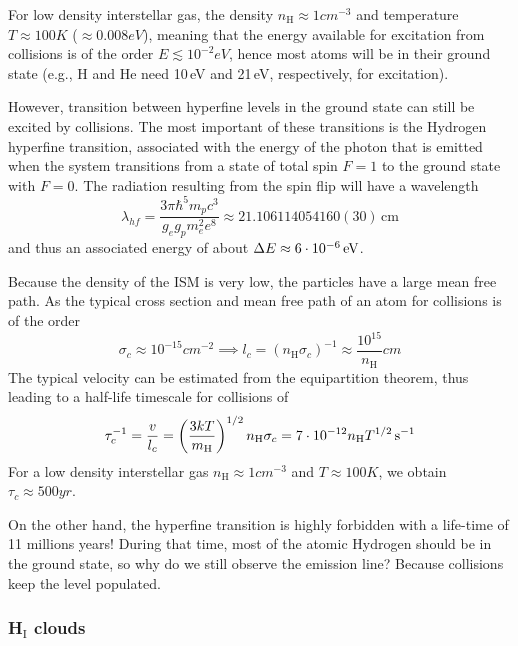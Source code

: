 For low density interstellar gas, the density $n_{\text{H}}\approx 1\unit{cm}^{-3}$ and temperature $T\approx 100\unit{K}$ ($\approx 0.008\unit{eV}$), meaning that the energy available for excitation from collisions is of the order $E\lesssim 10^{-2}\unit{eV}$, hence most atoms will be in their ground state (e.g., H and He need 10\,eV and 21\,eV, respectively, for excitation).
\par However, transition between hyperfine levels in the ground state can still be excited by collisions. The most important of these transitions is the Hydrogen hyperfine transition, associated with the energy of the photon that is emitted when the system transitions from a state of total spin $F=1$ to the ground state with $F=0$. The radiation resulting from the spin flip will have a wavelength 
\begin{equation}
    \lambda_{hf} = \frac{3\pi\hbar^{5}m_{p}c^{3}}{g_{e}g_{p}m_{e}^{2}e^{8}}\approx 21.106114054160(30)\,\text{cm}
    \label{eq:21cm}
\end{equation}
and thus an associated energy of about $\Delta E \approx 6\cdot 10^{-6}\,\text{eV}$.
\par Because the density of the ISM is very low, the particles have a large mean free path. As the typical cross section and mean free path of an atom for collisions is of the order
\begin{equation*}
    \sigma_{c} \approx 10^{-15}\unit{cm}^{-2} \implies l_{c} = (n_{\text{H}}\sigma_{c})^{-1}\approx \frac{10^{15}}{n_{\text{H}}}\unit{cm}
\end{equation*}
The typical velocity can be estimated from the equipartition theorem, thus leading to a half-life timescale for collisions of 
\begin{equation}
    \tau_{c}^{-1} = \frac{v}{l_{c}} = \left(\frac{3kT}{m_{\text{H}}}\right)^{1/2}n_{\text{H}}\sigma_{c} = 7\cdot 10^{-12}n_{\text{H}}T^{1/2}\,\text{s}^{-1}
    \label{eq:collisiontimescale}
\end{equation}
For a low density interstellar gas $n_{\text{H}}\approx 1\unit{cm}^{-3}$ and $T\approx 100\unit{K}$, we obtain $\tau_{c}\approx 500\unit{yr}$.
\par On the other hand, the hyperfine transition is highly forbidden with a life-time of 11 millions years! During that time, most of the atomic Hydrogen should be in the ground state, so why do we still observe the emission line? Because collisions keep the level populated.

\subsubsection*{H$_{\text{I}}$ clouds}

